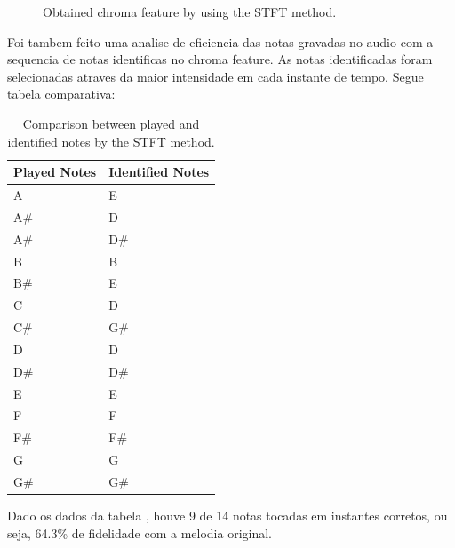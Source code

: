 \documentclass{article}
\begin{document}
	
	\begin{figure}[h]
	 \centerline{}
	 \caption{Obtained chroma feature by using the STFT method.}
	 \label{fig:1-ssft}
	\end{figure}	

	\newpage
	Foi tambem feito uma analise de eficiencia das notas gravadas no audio com a sequencia de notas identificas no chroma feature. As notas identificadas foram selecionadas atraves da maior intensidade em cada instante de tempo. Segue tabela comparativa:

	\begin{table}[h]
	 \begin{center}
	 \begin{tabular}{|l|l|}
	  \hline
	  Played Notes & Identified Notes \\
	  \hline
	  A  & E \\
	  A\#  & D \\
	  A\#  & D\# \\
	  B  & B \\
	  B\#  & E \\
	  C  & D \\
	  C\#  & G\# \\
	  D  & D \\
	  D\#  & D\# \\
	  E  & E \\
	  F  & F \\
	  F\#  & F\# \\
	  G  & G \\
	  G\#  & G\# \\
	  \hline
	 \end{tabular}
	\end{center}
	 \caption{Comparison between played and identified notes by the STFT method.}
	 \label{tab:table-1-sfft}
	\end{table}

	Dado os dados da tabela , houve 9 de 14 notas tocadas em instantes corretos, ou seja, 64.3\% de fidelidade com a melodia original.
\end{document}

